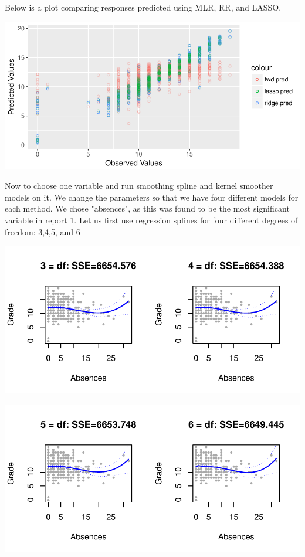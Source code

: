 \documentclass{article}
\begin{document}
Below is a plot comparing responses predicted using MLR, RR, and LASSO. 

\bigskip
\includegraphics{Report_4-008}

Now to choose one variable and run smoothing spline and kernel smoother models on it. We change the parameters so that we have four different models for each method. We chose "absences", as this was found to be the most significant variable in report 1.  Let us first use regression splines for four different degrees of freedom: 3,4,5, and 6

\includegraphics{Report_4-009}

\includegraphics{Report_4-010}
\end{document}
